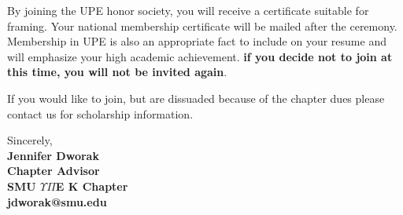 {\begin{letter}
        By joining the UPE honor society, you will receive a certificate suitable for framing.  Your national membership certificate will be mailed after the ceremony.  Membership in UPE is also an appropriate fact to include on your resume and will emphasize your high academic achievement. \textbf{if you decide not to join at this time, you will not be invited again}. 

        If you would like to join, but are dissuaded because of the chapter dues please contact us for scholarship information.

        \begin{flushright}
        \closing{Sincerely, \vspace{1 em}\\\textbf{\hspace{3 em}Jennifer Dworak\\\vspace{3 em}\hspace{3 em}Chapter Advisor\\\hspace{3 em}SMU $\Upsilon\Pi$E K Chapter\\\hspace{3 em}jdworak@smu.edu}}
        \end{flushright}
        \end{letter}
}
